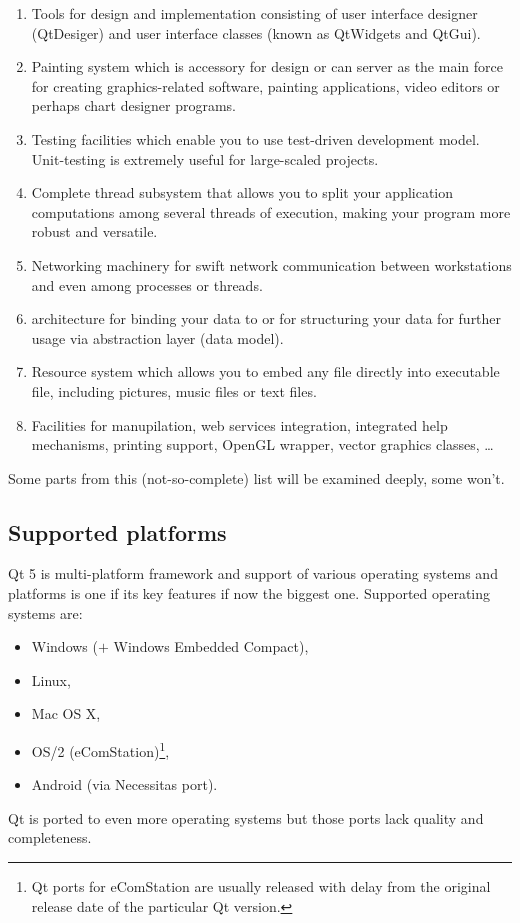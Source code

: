 \begin{enumerate}
\item Tools for  design and implementation consisting of user interface designer (QtDesiger) and user interface classes (known as QtWidgets and QtGui).
\item Painting system which is accessory for  design or can server as the main force for creating graphics-related software, \eg painting applications, video editors or perhaps chart designer programs.
\item Testing facilities which enable you to use test-driven development model. Unit-testing is extremely useful for large-scaled projects.
\item Complete thread subsystem that allows you to split your application computations among several threads of execution, making your program more robust and versatile.
\item Networking machinery for swift network communication between workstations and even among processes or threads.
\item {} architecture for binding your data to  or for structuring your data for further usage via abstraction layer (data model).
\item Resource system which allows you to embed any file directly into executable file, including pictures, music files or text files.
\item Facilities for  manupilation, web services integration, integrated help mechanisms, printing support, OpenGL wrapper, vector graphics classes, \ldots
\end{enumerate}

Some parts from this (not-so-complete) list will be examined deeply, some won't.

\subsection{Supported platforms}
Qt 5 is multi-platform framework and support of various operating systems and platforms is one if its key features if now the biggest one. Supported operating systems are:
\begin{itemize}
\item Windows ($+$ Windows Embedded Compact),
\item Linux,
\item Mac OS X,
\item OS/2 (eComStation)\footnote{Qt ports for eComStation are usually released with delay from the original release date of the particular Qt version.},
\item Android (via Necessitas port).
\end{itemize}
Qt is ported to even more operating systems but those ports lack quality and completeness.

